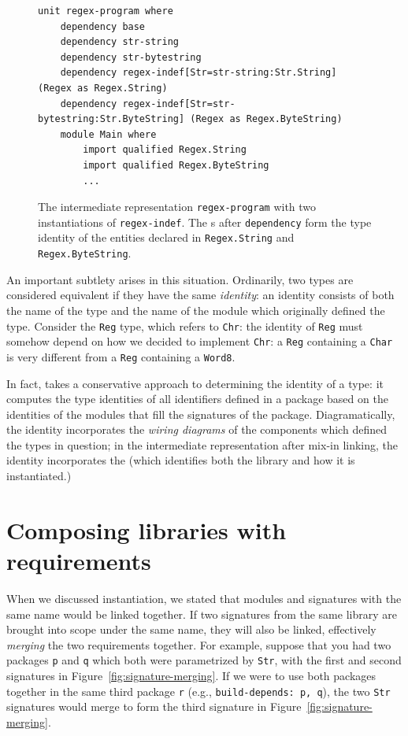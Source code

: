 \begin{figure}
\begin{lstlisting}
unit regex-program where
    dependency base
    dependency str-string
    dependency str-bytestring
    dependency regex-indef[Str=str-string:Str.String] (Regex as Regex.String)
    dependency regex-indef[Str=str-bytestring:Str.ByteString] (Regex as Regex.ByteString)
    module Main where
        import qualified Regex.String
        import qualified Regex.ByteString
        ...
\end{lstlisting}
\caption{The intermediate representation \texttt{regex-program} with two instantiations of \texttt{regex-indef}.  The \uid{}s after \texttt{dependency} form the type identity of the entities declared in \texttt{Regex.String} and \texttt{Regex.ByteString}.}
\label{fig:matcher-twice-bkp}
\end{figure}

An important subtlety arises in this situation.  Ordinarily, two types
are considered equivalent if they have the same \emph{identity}: an
identity consists of both the name of the type and the name of the
module which originally defined the type.  Consider the \verb|Reg| type,
which refers to \verb|Chr|: the identity of \verb|Reg| must somehow
depend on how we decided to implement \verb|Chr|: a \verb|Reg|
containing a \verb|Char| is very different from a \verb|Reg| containing
a \verb|Word8|.

In fact, \Backpack{} takes a conservative approach to determining the
identity of a type: it computes the type identities of all identifiers
defined in a package based on the identities of the modules that fill
the signatures of the package.  Diagramatically, the identity
incorporates the \emph{wiring diagrams} of the components which defined
the types in question; in the intermediate representation after mix-in
linking, the identity incorporates the \uid{} (which
identifies both the library and how it is instantiated.)

\section{Composing libraries with requirements}

When we discussed instantiation, we stated that modules and signatures
with the same name would be linked together.  If two signatures from the
same library are brought into scope under the same name, they will also
be linked, effectively \emph{merging} the two requirements together.
For example, suppose that you had two packages \verb|p| and \verb|q|
which both were parametrized by \verb|Str|, with the first and second
signatures in Figure~\ref{fig:signature-merging}.  If we were to use
both packages together in the same third package \verb|r| (e.g.,
\verb|build-depends: p, q|), the two \verb|Str| signatures would merge
to form the third signature in Figure~\ref{fig:signature-merging}.


